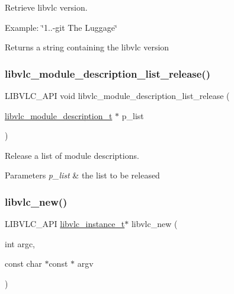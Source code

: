 Retrieve libvlc version.

Example\+: \char`\"{}1..-\/git The Luggage\char`\"{}

\begin{DoxyReturn}{Returns}
a string containing the libvlc version 
\end{DoxyReturn}
\mbox{\label{group__libvlc__core_ga6f077c04819910cf821e107be8b258a9}} 
\subsubsection{\texorpdfstring{libvlc\+\_\+module\+\_\+description\+\_\+list\+\_\+release()}{libvlc\_module\_description\_list\_release()}}
{\footnotesize\ttfamily L\+I\+B\+V\+L\+C\+\_\+\+A\+PI void libvlc\+\_\+module\+\_\+description\+\_\+list\+\_\+release (\begin{DoxyParamCaption}\item[{\hyperlink{structlibvlc__module__description__t}{libvlc\+\_\+module\+\_\+description\+\_\+t} $\ast$}]{p\+\_\+list }\end{DoxyParamCaption})}

Release a list of module descriptions.


\begin{DoxyParams}{Parameters}
{\em p\+\_\+list} & the list to be released \\
\hline
\end{DoxyParams}
\mbox{\label{group__libvlc__core_ga1ecba605b37df9e62d2f8c0290ef3893}} 
\subsubsection{\texorpdfstring{libvlc\+\_\+new()}{libvlc\_new()}}
{\footnotesize\ttfamily L\+I\+B\+V\+L\+C\+\_\+\+A\+PI \hyperlink{group__libvlc__core_ga316d739a80da4678206c79f4d6c2e284}{libvlc\+\_\+instance\+\_\+t}$\ast$ libvlc\+\_\+new (\begin{DoxyParamCaption}\item[{int}]{argc,  }\item[{const char $\ast$const $\ast$}]{argv }\end{DoxyParamCaption})}

